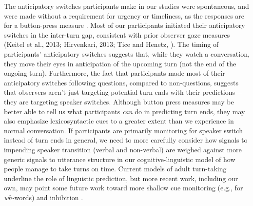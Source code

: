 \documentclass[authoryear, 12pt]{elsarticle}
\begin{document}
The anticipatory switches participants make in our studies were spontaneous, and were made without a requirement for urgency or timeliness, as the responses are for a button-press measure \citep{de-ruiter2006, magyari2012}. Most of our participants initiated their anticipatory switches in the inter-turn gap, consistent with prior observer gaze measures (Keitel et al., 2013; Hirvenkari, 2013; Tice and Henetz, \citeyear{TiceHenetz11}). The timing of participants' anticipatory switches suggests that, while they watch a conversation, they move their eyes in anticipation of the upcoming turn (not the end of the ongoing turn). Furthermore, the fact that participants made most of their anticipatory switches following questions, compared to non-questions, suggests that observers aren't just targeting potential turn-ends with their predictions---they are targeting speaker switches. Although button press measures may be better able to tell us what participants \textit{can} do in predicting turn ends, they may also emphasize lexicosyntactic cues to a greater extent than we experience in normal conversation. If participants are primarily monitoring for speaker switch instead of turn ends in general, we need to more carefully consider how signals to impending speaker transition (verbal and non-verbal) are weighed against more generic signals to utterance structure in our cognitive-linguistic model of how people manage to take turns on time. Current models of adult turn-taking underline the role of linguistic prediction, but more recent work, including our own, may point some future work toward more shallow cue monitoring (e.g., for \textit{wh-}words) and inhibition \citep{bogelsUndRev}.
\end{document}
